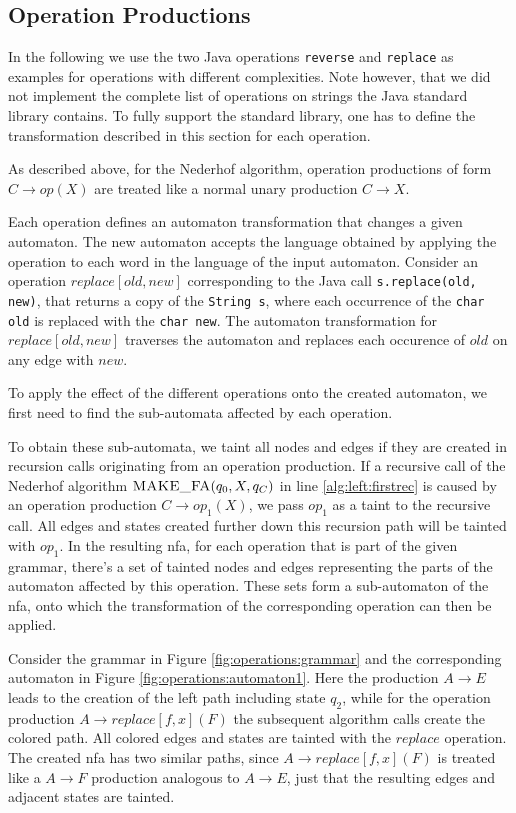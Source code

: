 \subsection{Operation Productions}\label{sec:opProduction}

In the following we use the two Java operations \lstinline|reverse| and \lstinline|replace| as examples for operations with different complexities. Note however, that we did not implement the complete list of operations on strings the Java standard library contains. To fully support the standard library, one has to define the transformation described in this section for each operation. 

As described above, for the Nederhof algorithm, operation productions of form $C \rightarrow op(X)$ are treated like a normal unary production $C \rightarrow X$.

Each operation defines an automaton transformation that changes a given automaton.
The new automaton accepts the language obtained by applying the operation to each word in the language of the input automaton.
Consider an operation $replace[old, new]$ corresponding to the Java call \lstinline|s.replace(old, new)|, that returns a copy of the \lstinline|String s|, where each occurrence of the \lstinline|char old| is replaced with the \lstinline|char new|.
The automaton transformation for $replace[old, new]$ traverses the automaton and replaces each occurence of $old$ on any edge with $new$.

To apply the effect of the different operations onto the created automaton, we first need to find the sub-automata affected by each operation.

To obtain these sub-automata, we taint all nodes and edges if they are created in recursion calls originating from an operation production. 
If a recursive call of the Nederhof algorithm $\textproc{MAKE\_FA}(q_0, X, q_C)$ in line \ref{alg:left:firstrec} is caused by an operation production $C \rightarrow op_1(X)$, we pass $op_1$ as a taint to the recursive call. All edges and states created further down this recursion path will be tainted with $op_1$. In the resulting \ac{nfa}, for each operation that is part of the given grammar, there's a set of tainted nodes and edges representing the parts of the automaton affected by this operation. These sets form a sub-automaton of the \ac{nfa}, onto which the transformation of the corresponding operation can then be applied.

Consider the grammar in Figure \ref{fig:operations:grammar} and the corresponding automaton in Figure \ref{fig:operations:automaton1}. Here the production $A \rightarrow E$ leads to the creation of the left path including state $q_2$, while for the operation production $A \rightarrow replace[f,x](F)$ the subsequent algorithm calls create the colored path. All colored edges and states are tainted with the $replace$ operation. The created \ac{nfa} has two similar paths, since $A \rightarrow replace[f,x](F)$ is treated like a $A \rightarrow F$ production analogous to $A \rightarrow E$, just that the resulting edges and adjacent states are tainted.

